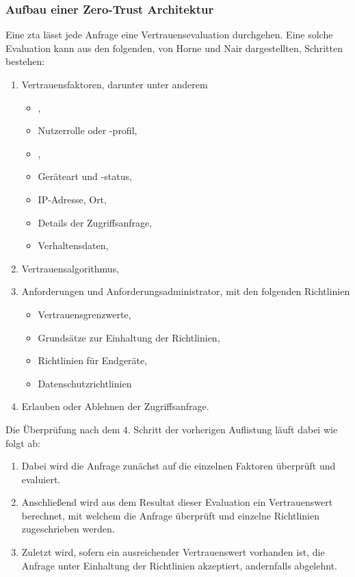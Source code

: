 \subsubsection{Aufbau einer Zero-Trust Architektur}

Eine \ac{zta} lässt jede Anfrage eine Vertrauensevaluation durchgehen.
Eine solche Evaluation kann aus den folgenden, von Horne und Nair dargestellten, Schritten bestehen\autocite[\vglf][]{horne-2021}:
\begin{enumerate}
    \item Vertrauensfaktoren, darunter unter anderem
    \begin{itemize}
        \item {},
        \item Nutzerrolle oder -profil,
        \item {},
        \item Geräteart und -status,
        \item IP-Adresse, \bzw Ort,
        \item Details der Zugriffsanfrage,
        \item Verhaltensdaten,
    \end{itemize}
    \item Vertrauensalgorithmus,
    \item Anforderungen und Anforderungsadministrator, mit den folgenden Richtlinien
    \begin{itemize}
        \item Vertrauensgrenzwerte,
        \item Grundsätze zur Einhaltung der Richtlinien,
        \item Richtlinien für Endgeräte,
        \item Datenschutzrichtlinien
    \end{itemize}
    \item Erlauben oder Ablehnen der Zugriffsanfrage.
\end{enumerate}
Die Überprüfung nach dem $4.$ Schritt der vorherigen Auflistung läuft dabei wie folgt ab:\autocite[\vglf][]{horne-2021}
\begin{enumerate}
    \item Dabei wird die Anfrage zunächst auf die einzelnen Faktoren überprüft und evaluiert.
    \item Anschließend wird aus dem Resultat dieser Evaluation ein Vertrauenswert berechnet, mit welchem die Anfrage überprüft und einzelne Richtlinien zugeschrieben werden.
    \item Zuletzt wird, sofern ein ausreichender Vertrauenswert vorhanden ist, die Anfrage unter Einhaltung der Richtlinien akzeptiert, andernfalls abgelehnt.
\end{enumerate}

